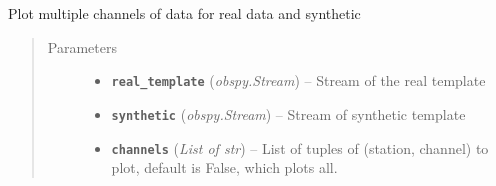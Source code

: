 \documentclass[a4paper,10pt,english]{sphinxmanual}
\begin{document}

\begin{fulllineitems}
\label{submodules/utils.EQcorrscan_plotting:EQcorrscan_plotting.plot_synth_real}
Plot multiple channels of data for real data and synthetic
\begin{quote}\begin{description}
\item[{Parameters}] \leavevmode\begin{itemize}
\item {} 
\textbf{\texttt{real\_template}} (\emph{obspy.Stream}) -- Stream of the real template

\item {} 
\textbf{\texttt{synthetic}} (\emph{obspy.Stream}) -- Stream of synthetic template

\item {} 
\textbf{\texttt{channels}} (\emph{List of str}) -- List of tuples of (station, channel) to plot, default is            False, which plots all.

\end{itemize}

\end{description}\end{quote}

\end{fulllineitems}

\end{document}
